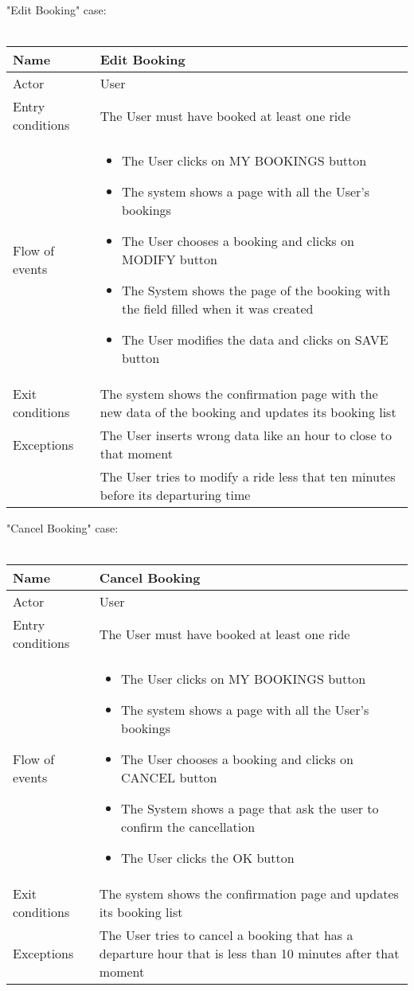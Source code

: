 \newpage
"Edit Booking" case:
\\
\\
\begin{tabular}{|p{3cm}|p{10cm}|}
\hline
Name & Edit Booking\\
\hline
Actor & User\\
\hline
Entry conditions & The User must have booked at least one ride\\
\hline
Flow of events &
	\begin{itemize}
			\item The User clicks on MY BOOKINGS button
			\item The system shows a page with all the User's bookings
			\item The User chooses a booking and clicks on MODIFY button
			\item The System shows the page of the booking with the field filled when it was created
			\item The User modifies the data and clicks on SAVE button
	\end{itemize}\\
\hline
Exit conditions & The system shows the confirmation page with the new data of the booking and updates its booking list\\
\hline
Exceptions & The User inserts wrong data like an hour to close to that moment\\
			& The User tries to modify a ride less that ten minutes before its departuring time\\
\hline
\end {tabular}

\newpage
"Cancel Booking" case:
\\
\\
\begin{tabular}{|p{3cm}|p{10cm}|}
\hline
Name & Cancel Booking\\
\hline
Actor & User\\
\hline
Entry conditions & The User must have booked at least one ride\\
\hline
Flow of events &
	\begin{itemize}
		\item The User clicks on MY BOOKINGS button
		\item The system shows a page with all the User's bookings
		\item The User chooses a booking and clicks on CANCEL button
		\item The System shows a page that ask the user to confirm the cancellation
		\item The User clicks the OK button
	\end{itemize}\\
\hline
Exit conditions & The system shows the confirmation page and updates its booking list\\
\hline
Exceptions & The User tries to cancel a booking that has a departure hour that is less than 10 minutes after that moment\\
\hline
\end {tabular}

